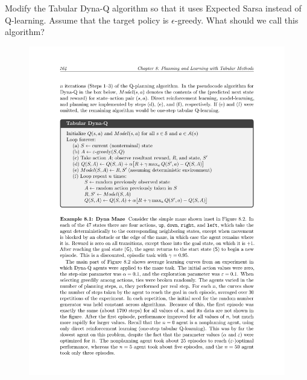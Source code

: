 Modify the Tabular Dyna-Q algorithm so that it uses Expected Sarsa instead of Q-learning. Assume that the target policy is $\epsilon$-greedy. What should we call this algorithm?
\begin{figure}[h!]
  \center
  \includegraphics[width=0.9\linewidth]{figures/c2m4_dyna_alg.pdf}
\end{figure}

